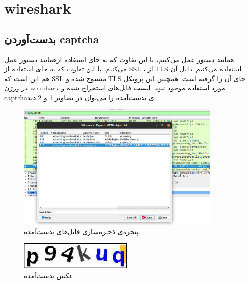 \documentclass{article}
\begin{document}
\section{wireshark}
\subsection{بدست‌آوردن captcha}

همانند دستور عمل می‌کنیم، با این تفاوت که به جای استفاده ازهمانند دستور عمل می‌کنیم، با این تفاوت که به جای استفاده از SSL ، از TLS استفاده می‌کنیم. دلیل آن هم این است که SSL منسوخ شده و TLS جای آن را گرفته است. همچنین این پروتکل در ورژن wireshark مورد استفاده موجود نبود. لیست فایل‌‌های استخراج شده و captchaی بدست‌آمده را می‌توان در تصاویر \ref{fig:1} و \ref{fig:captcha} دید.

\begin{figure}[h!]
	\centering
	\includegraphics[width=0.9\textwidth]{src/1.png}
	\caption{پنجره‌ی ذخیره‌سازی فایل‌های بدست‌آمده.}
	\label{fig:1}
\end{figure}
\begin{figure}[h!]
	\centering
	\includegraphics[width=0.5\textwidth]{src/captcha.jpeg}
	\caption{عکس بدست‌آمده.}
	\label{fig:captcha}
\end{figure}
\end{document}
